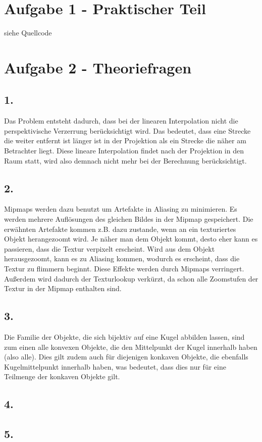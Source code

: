 \documentclass[12pt]{scrreprt}
\begin{document}


\chapter*{Aufgabe 1 - Praktischer Teil}

siehe Quellcode

\chapter*{Aufgabe 2 - Theoriefragen}
\section*{1.}
Das Problem entsteht dadurch, dass bei der linearen Interpolation nicht die perspektivische Verzerrung berücksichtigt wird. Das bedeutet, dass eine Strecke die weiter entfernt ist länger ist in der Projektion als ein Strecke die näher am Betrachter liegt. 
Diese lineare Interpolation findet nach der Projektion in den Raum statt, wird also demnach nicht mehr bei der Berechnung berücksichtigt.
\section*{2.}
Mipmaps werden dazu benutzt um Artefakte in Aliasing zu minimieren. Es werden mehrere Auflösungen des gleichen Bildes in der Mipmap gespeichert. Die erwähnten Artefakte kommen z.B. dazu zustande, wenn an ein texturiertes Objekt herangezoomt wird. Je näher man dem Objekt kommt, desto eher kann es passieren, dass die Textur verpixelt erscheint. Wird aus dem Objekt herausgezoomt, kann es zu Aliasing kommen, wodurch es erscheint, dass die Textur zu flimmern beginnt. Diese Effekte werden durch Mipmaps verringert. Außerdem wird dadurch der Texturlookup verkürzt, da schon alle Zoomstufen der Textur in der Mipmap enthalten sind.
\section*{3.}
Die Familie der Objekte, die sich bijektiv auf eine Kugel abbilden lassen, sind zum einen alle konvexen Objekte, die den Mittelpunkt der Kugel innerhalb haben (also alle). Dies gilt zudem auch für diejenigen konkaven Objekte, die ebenfalls Kugelmittelpunkt innerhalb haben, was bedeutet, dass dies nur für eine Teilmenge der konkaven Objekte gilt.
\section*{4.}
\section*{5.}
\end{document}
